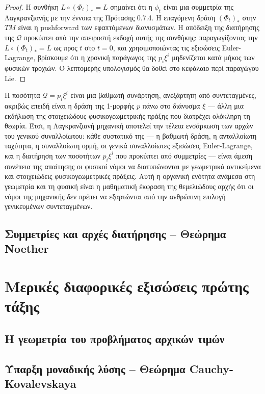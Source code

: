 \documentclass[11pt,a4paper,twoside,openright]{book}
\begin{document}
\begin{proof}
Η συνθήκη $L \circ (\Phi_t)_* = L$ σημαίνει ότι η $\phi_t$ είναι μια συμμετρία της Λαγκρανζιανής με την έννοια της Πρότασης 0.7.4. Η επαγόμενη δράση $(\Phi_t)_*$ στην $TM$ είναι η pushforward των εφαπτόμενων διανυσμάτων. Η απόδειξη της διατήρησης της $\mathcal{Q}$ προκύπτει από την απειροστή εκδοχή αυτής της συνθήκης: παραγωγίζοντας την $L \circ (\Phi_t)_* = L$ ως προς $t$ στο $t = 0$, και χρησιμοποιώντας τις εξισώσεις Euler-Lagrange, βρίσκουμε ότι η χρονική παράγωγος της $p_i \xi^i$ μηδενίζεται κατά μήκος των φυσικών τροχιών. Ο λεπτομερής υπολογισμός θα δοθεί στο κεφάλαιο περί παραγώγου Lie.
\end{proof}

Η ποσότητα $\mathcal{Q} = p_i \xi^i$ είναι μια βαθμωτή συνάρτηση, ανεξάρτητη από συντεταγμένες, ακριβώς επειδή είναι η δράση της 1-μορφής $p$ πάνω στο διάνυσμα $\xi$ — άλλη μια εκδήλωση της στοιχειώδους φυσικογεωμετρικής πράξης που διατρέχει ολόκληρη τη θεωρία. Έτσι, η Λαγκρανζιανή μηχανική αποτελεί την τέλεια ενσάρκωση των αρχών του γενικού συναλλοίωτου: κάθε συστατικό της — η βαθμωτή δράση, η ανταλλοίωτη ταχύτητα, η συναλλοίωτη ορμή, οι γενικά συναλλοίωτες εξισώσεις Euler-Lagrange, και η διατήρηση των ποσοτήτων $p_i \xi^i$ που προκύπτει από συμμετρίες — είναι άμεση συνέπεια της απαίτησης οι φυσικοί νόμοι να διατυπώνονται με γεωμετρικά αντικείμενα και στοιχειώδεις φυσικογεωμετρικές πράξεις. Αυτή η οργανική ενότητα ανάμεσα στη γεωμετρία και τη φυσική είναι η μαθηματική έκφραση της θεμελιώδους αρχής ότι οι νόμοι της μηχανικής δεν πρέπει να εξαρτώνται από την ανθρώπινη επιλογή γενικευμένων συντεταγμένων.

\section{Συμμετρίες και αρχές διατήρησης -- Θεώρημα Noether}

\chapter{Μερικές διαφορικές εξισώσεις πρώτης τάξης}
	\label{chapter:pde-first-order}
	
\section{Η γεωμετρία του προβλήματος αρχικών τιμών}
\section{Ύπαρξη μοναδικής λύσης -- Θεώρημα Cauchy-Kovalevskaya}
\end{document}
